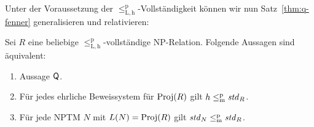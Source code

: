 Unter der Voraussetzung der $\leq_\mathrm{L,h}^\mathrm p$-Vollständigkeit können wir nun Satz~\ref{thm:q-fenner} generalisieren und relativieren:
\begin{theorem}\label{thm:q-fenner-generalized}
    Sei $R$ eine beliebige $\leq_\mathrm{L,h}^\mathrm p$-vollständige NP-Relation.
    Folgende Aussagen sind äquivalent:
    \begin{enumerate}
        \item Aussage $\mathsf{Q}$.
        \item Für jedes ehrliche Beweissystem für $\operatorname{Proj}(R)$ gilt $h\leq_\mathrm{m}^\mathrm{p} \mathit{std}_R$.
        \item Für jede NPTM $N$ mit $L(N)=\operatorname{Proj}(R)$ gilt $\mathit{std}_N\leq_\mathrm{m}^\mathrm{p}\mathit{std}_R$.
    \end{enumerate}
\end{theorem}
